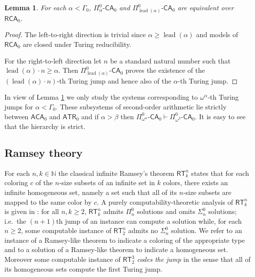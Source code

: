 \documentclass[11pt]{amsart}
\newtheorem{lemma}[thm]{Lemma}
\theoremstyle{definition}
\theoremstyle{remark}
\theoremstyle{plain}
\newcommand{\numberset}{\mathbb}
\newcommand{\N}{\numberset{N}}
\def\a{\alpha}
\def\b{\beta}
\def\G{\Gamma}
\newcommand{\RCA}{\mathsf{RCA}_0}
\newcommand{\ACA}{\mathsf{ACA}_0}
\newcommand{\ATR}{\mathsf{ATR}_0}
\newcommand{\RT}{\mathsf{RT}}
\newcommand{\lead}{\operatorname{lead}}
\newcommand{\CA}{\mathsf{\text{-}CA}_0}
\def\N{{\mathbb{N}}}
\newcommand{\lorenzo}[1]{\textcolor{blue}{#1}}
\begin{document}
\begin{lemma}\label{equivsystems}
For each $\alpha < \G_0$, $\Pi^0_{\alpha} \CA$ and $\Pi^0_{\lead(\alpha)} \CA$ are equivalent over $\RCA$.
\end{lemma}

\begin{proof}
The left-to-right direction is trivial since $\alpha \ge \lead(\alpha)$ and models of $\RCA$ are closed under Turing reducibility.

For the right-to-left direction let $n$ be a standard natural number such that $\lead(\alpha) \cdot n \ge \alpha$.
Then $\Pi^0_{\lead(\alpha)} \CA$ proves the existence of the $(\lead(\alpha) \cdot n)$-th Turing jump and hence also of the $\alpha$-th Turing jump.
\end{proof}

In view of Lemma \ref{equivsystems} we only study the systems corresponding to $\omega^\alpha$-th Turing jumps for $\alpha < \Gamma_0$.
These subsystems of second-order arithmetic lie strictly between $\ACA$ and $\ATR$ and if $\alpha > \beta$ then $\Pi^0_{\omega^\a} \CA \vdash \Pi^0_{\omega^\b} \CA$.
It is easy to see that the hierarchy is strict.


%
%

\subsection{Ramsey theory}\label{ssec:ramsey theory}

%
%

For each $n,k \in \N$ the classical infinite Ramsey's theorem $\RT^n_k$ states that for each coloring $c$ of the $n$-size subsets of an infinite set in $k$ colors, there exists an infinite homogeneous set, namely a set such that all of its $n$-size subsets are mapped to the same color by $c$. 
A purely computability-theoretic analysis of $\RT^n_k$ is given in \cite{jockusch}: for all $n,k\geq 2$, $\RT^n_k$ admits $\Pi^0_n$ solutions and omits $\Sigma^0_n$ solutions; i.e.\ the $(n+1)$th jump of an instance can compute a solution while, for each $n\geq 2$, some computable instance of $\RT^n_2$ admits no $\Sigma^0_n$ solution. 
We refer to an instance of a Ramsey-like theorem to indicate a coloring of the appropriate type and to a solution of a Ramsey-like theorem to indicate a homogeneous set. 
Moreover some computable instance of $\RT^3_2$ {\em codes the jump} in the sense that all of its homogeneous sets compute the first Turing jump.
\end{document}
